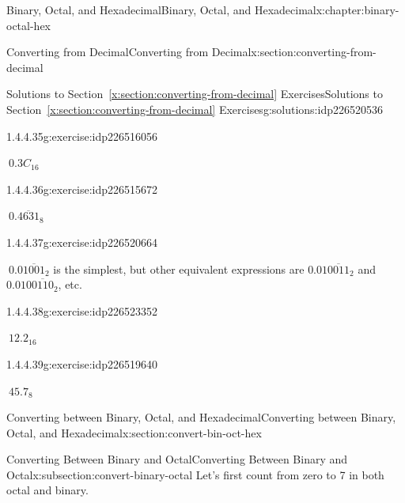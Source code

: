 \documentclass[twoside,10pt,]{book}
\newcommand{\xreffont}{\relax}
\numberwithin{equation}{section}
\begin{document}
\begin{chapterptx}{Binary, Octal, and Hexadecimal}{}{Binary, Octal, and Hexadecimal}{}{}{x:chapter:binary-octal-hex}
\begin{sectionptx}{Converting from Decimal}{}{Converting from Decimal}{}{}{x:section:converting-from-decimal}
\begin{solutions-subsection}{Solutions to Section~{\xreffont\ref*{x:section:converting-from-decimal}} Exercises}{}{Solutions to Section~{\xreffont\ref*{x:section:converting-from-decimal}} Exercises}{}{}{g:solutions:idp226520536}
\begin{exercisegroup}
\begin{divisionsolutioneg}{1.4.4.35}{}{g:exercise:idp226516056}
\par\smallskip%
\noindent\hypertarget{g:solution:idp226517976-main}{}\(\ 0.3C_{16}\)\end{divisionsolutioneg}%
\begin{divisionsolutioneg}{1.4.4.36}{}{g:exercise:idp226515672}%
\par\smallskip%
\noindent\hypertarget{g:solution:idp226518488-main}{}\(\ 0.\overline{4631}_8\)\end{divisionsolutioneg}%
\begin{divisionsolutioneg}{1.4.4.37}{}{g:exercise:idp226520664}%
\par\smallskip%
\noindent\hypertarget{g:solution:idp226522456-main}{}\(\ 0.0\overline{1001}_2\) is the simplest, but other equivalent expressions are \(0.01\overline{0011}_2\) and \(0.010\overline{0110}_2\), etc.\end{divisionsolutioneg}%
\begin{divisionsolutioneg}{1.4.4.38}{}{g:exercise:idp226523352}%
\par\smallskip%
\noindent\hypertarget{g:solution:idp226520024-main}{}\(\ 12.2_{16}\)\end{divisionsolutioneg}%
\begin{divisionsolutioneg}{1.4.4.39}{}{g:exercise:idp226519640}%
\par\smallskip%
\noindent\hypertarget{g:solution:idp226516184-main}{}\(\ 45.7_8\)\end{divisionsolutioneg}%
\end{exercisegroup}
\par\medskip\noindent
\end{solutions-subsection}
\end{sectionptx}
%
%
\typeout{************************************************}
\typeout{************************************************}
%
\begin{sectionptx}{Converting between Binary, Octal, and Hexadecimal}{}{Converting between Binary, Octal, and Hexadecimal}{}{}{x:section:convert-bin-oct-hex}
%
%
\typeout{************************************************}
\typeout{************************************************}
%
\begin{subsectionptx}{Converting Between Binary and Octal}{}{Converting Between Binary and Octal}{}{}{x:subsection:convert-binary-octal}
Let's first count from zero to 7 in both octal and binary. \begin{center}%

\end{center}
\end{subsectionptx}
\end{sectionptx}
\end{chapterptx}
\end{document}
